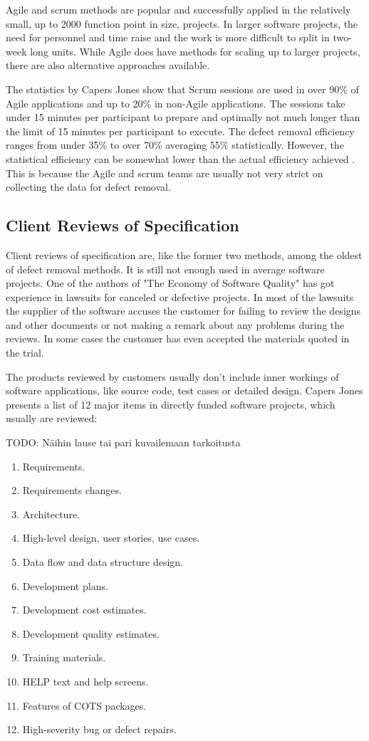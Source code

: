 Agile and scrum methods are popular and successfully applied in the relatively small, up to 2000 function point in size, projects. In larger software projects, the need for personnel and time raise and the work is more difficult to split in two-week long units. While Agile does have methods for scaling up to larger projects, there are also alternative approaches available.

The statistics by Capers Jones show that Scrum sessions are used in over 90\% of Agile applications and up to 20\% in non-Agile applications. The sessions take under 15 minutes per participant to prepare and optimally not much longer than the limit of 15 minutes per participant to execute. The defect removal efficiency ranges from under 35\% to over 70\% averaging 55\% statistically. However, the statistical efficiency can be somewhat lower than the actual efficiency achieved . This is because the Agile and scrum teams are usually not very strict on collecting the data for defect removal.

\subsection{Client Reviews of Specification} 
Client reviews of specification are, like the former two methods, among the oldest of defect removal methods. It is still not enough used in average software projects. One of the authors of "The Economy of Software Quality" has got experience in lawsuits for canceled or defective projects. In most of the lawsuits the supplier of the software accuses the customer for failing to review the designs and other documents or not making a remark about any problems during the reviews. In some cases the customer has even accepted the materials quoted in the trial.

The products reviewed by customers usually don't include inner workings of software applications, like source code, test cases or detailed design. Capers Jones presents a list of 12 major items in directly funded software projects, which usually are reviewed:

TODO: Näihin lause tai pari kuvailemaan tarkoitusta

\begin{enumerate}
	\item Requirements.
	\item Requirements changes.
	\item Architecture.
	\item High-level design, user stories, use cases.
	\item Data flow and data structure design.
	\item Development plans.
	\item Development cost estimates.
	\item Development quality estimates.
	\item Training materials.
	\item HELP text and help screens.
	\item Features of COTS packages.
	\item High-severity bug or defect repairs.
\end{enumerate}

